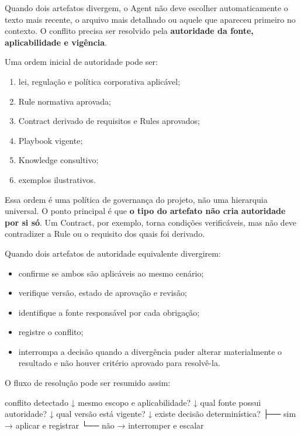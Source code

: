\documentclass[
  10pt,
  a4paper,
  oneside]{book}
\newenvironment{Shaded}{}{}
\newcommand{\NormalTok}[1]{#1}
\providecommand{\tightlist}{%
  \setlength{\itemsep}{0pt}\setlength{\parskip}{0pt}}
\renewenvironment{Shaded}{\begin{snugshade}}{\end{snugshade}}%
\begin{document}
Quando dois artefatos divergem, o Agent não deve escolher
automaticamente o texto mais recente, o arquivo mais detalhado ou aquele
que apareceu primeiro no contexto. O conflito precisa ser resolvido pela
\textbf{autoridade da fonte, aplicabilidade e vigência}.

Uma ordem inicial de autoridade pode ser:

\begin{enumerate}
\def\labelenumi{\arabic{enumi}.}
\tightlist
\item
  lei, regulação e política corporativa aplicável;
\item
  Rule normativa aprovada;
\item
  Contract derivado de requisitos e Rules aprovados;
\item
  Playbook vigente;
\item
  Knowledge consultivo;
\item
  exemplos ilustrativos.
\end{enumerate}

Essa ordem é uma política de governança do projeto, não uma hierarquia
universal. O ponto principal é que \textbf{o tipo do artefato não cria
autoridade por si só}. Um Contract, por exemplo, torna condições
verificáveis, mas não deve contradizer a Rule ou o requisito dos quais
foi derivado.

Quando dois artefatos de autoridade equivalente divergirem:

\begin{itemize}
\tightlist
\item
  confirme se ambos são aplicáveis ao mesmo cenário;
\item
  verifique versão, estado de aprovação e revisão;
\item
  identifique a fonte responsável por cada obrigação;
\item
  registre o conflito;
\item
  interrompa a decisão quando a divergência puder alterar materialmente
  o resultado e não houver critério aprovado para resolvê-la.
\end{itemize}

O fluxo de resolução pode ser resumido assim:

\begin{Shaded}
\begin{Highlighting}[]
\NormalTok{conflito detectado}
\NormalTok{        ↓}
\NormalTok{mesmo escopo e aplicabilidade?}
\NormalTok{        ↓}
\NormalTok{qual fonte possui autoridade?}
\NormalTok{        ↓}
\NormalTok{qual versão está vigente?}
\NormalTok{        ↓}
\NormalTok{existe decisão determinística?}
\NormalTok{   ├── sim → aplicar e registrar}
\NormalTok{   └── não → interromper e escalar}
\end{Highlighting}
\end{Shaded}
\end{document}
